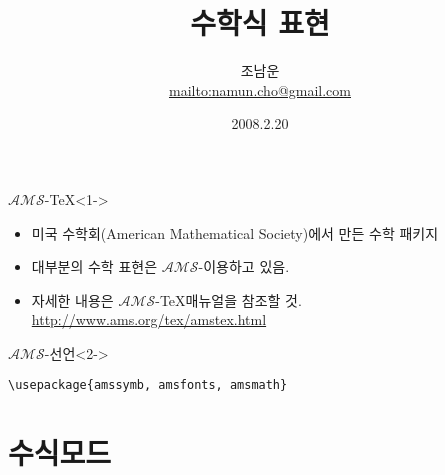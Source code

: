 \documentclass{beamer}
\begin{document}
\author{조남운\\\url{mailto:namun.cho@gmail.com}}
\title{수학식 표현}
\date{2008.2.20}

\begin{frame}
\maketitle
\end{frame}




\begin{frame}[fragile]
\begin{block}{$\mathcal{AMS}$-\TeX}<1->
	\begin{itemize}
		\item 미국 수학회(American Mathematical Society)에서 만든 수학 패키지
		\item 대부분의 수학 표현은 $\mathcal{AMS}$- 이용하고 있음. 
		\item 자세한 내용은 $\mathcal{AMS}$-\TeX 매뉴얼을 참조할 것. 
		\url{http://www.ams.org/tex/amstex.html}
	\end{itemize}

\end{block}
\begin{block}{$\mathcal{AMS}$- 선언}<2->
\begin{center}
\begin{verbatim}
\usepackage{amssymb, amsfonts, amsmath}
\end{verbatim}
\end{center}
\end{block}
\end{frame}
\section{수식모드}
\end{document}
